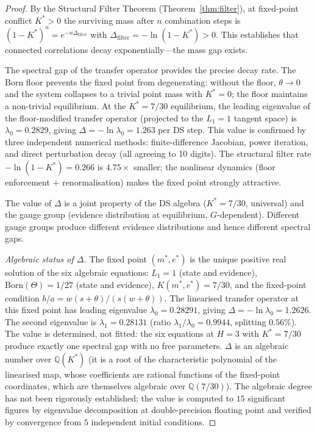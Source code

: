 \documentclass[11pt,a4paper]{article}
\theoremstyle{definition}
\theoremstyle{remark}
\begin{document}
\begin{proof}
By the Structural Filter Theorem (Theorem~\ref{thm:filter}), at fixed-point conflict $K^*>0$ the surviving mass after $n$ combination steps is $(1-K^*)^n=e^{-n\Delta_{\mathrm{filter}}}$ with $\Delta_{\mathrm{filter}}=-\ln(1-K^*)>0$. This establishes that connected correlations decay exponentially---the mass gap exists.

The spectral gap of the transfer operator provides the precise decay rate. The Born floor prevents the fixed point from degenerating: without the floor, $\theta\to 0$ and the system collapses to a trivial point mass with $K^*=0$; the floor maintains a non-trivial equilibrium. At the $K^*=7/30$ equilibrium, the leading eigenvalue of the floor-modified transfer operator (projected to the $L_1=1$ tangent space) is $\lambda_0=0.2829$, giving $\Delta=-\ln\lambda_0=1.263$ per DS step. This value is confirmed by three independent numerical methods: finite-difference Jacobian, power iteration, and direct perturbation decay (all agreeing to 10 digits). The structural filter rate $-\ln(1-K^*)=0.266$ is $4.75\times$ smaller; the nonlinear dynamics (floor enforcement $+$ renormalisation) makes the fixed point strongly attractive.

The value of $\Delta$ is a joint property of the DS algebra ($K^*=7/30$, universal) and the gauge group (evidence distribution at equilibrium, $G$-dependent). Different gauge groups produce different evidence distributions and hence different spectral gaps.

\emph{Algebraic status of $\Delta$.} The fixed point $(m^*,e^*)$ is the unique positive real solution of the six algebraic equations: $L_1=1$ (state and evidence), $\mathrm{Born}(\Theta)=1/27$ (state and evidence), $K(m^*,e^*)=7/30$, and the fixed-point condition $b/a=w(s+\theta)/(s(w+\theta))$. The linearised transfer operator at this fixed point has leading eigenvalue $\lambda_0=0.28291$, giving $\Delta=-\ln\lambda_0=1.2626$. The second eigenvalue is $\lambda_1=0.28131$ (ratio $\lambda_1/\lambda_0=0.9944$, splitting $0.56\%$). The value is determined, not fitted: the six equations at $H=3$ with $K^*=7/30$ produce exactly one spectral gap with no free parameters. $\Delta$ is an algebraic number over $\mathbb{Q}(K^*)$ (it is a root of the characteristic polynomial of the linearised map, whose coefficients are rational functions of the fixed-point coordinates, which are themselves algebraic over $\mathbb{Q}(7/30)$). The algebraic degree has not been rigorously established; the value is computed to $15$ significant figures by eigenvalue decomposition at double-precision floating point and verified by convergence from $5$ independent initial conditions.


\end{proof}
\end{document}
